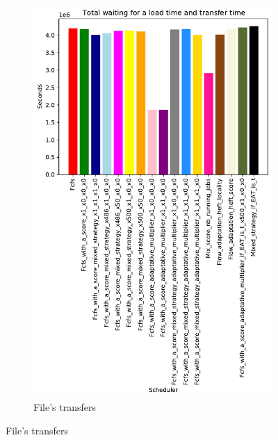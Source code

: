\documentclass[a4paper]{article}
\begin{document}
\begin{figure}[H]
\begin{subfigure}[b]{0.4\linewidth}\centering\includegraphics[width=0.9\linewidth]{MBSS/plot/Results_FCFS_Score_Adaptative_Multiplier_2022-04-07->2022-04-09_V9271_Total_waiting_for_a_load_time_and_transfer_time_450_128_32_256_4_1024.pdf}\caption{File's transfers}\end{subfigure}

\end{figure}
\end{document}
